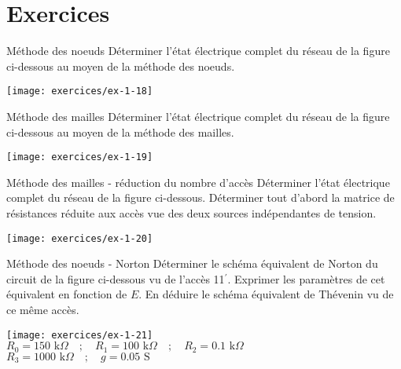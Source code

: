 
\section{Exercices}
\begin{exercise}{Méthode des noeuds}\label{ex:mg-1}
Déterminer l'état électrique complet du réseau de la  figure ci-dessous au
moyen de la méthode des noeuds.
\begin{center}
	\texttt{[image: exercices/ex-1-18]}
\end{center}
\end{exercise}

\begin{exercise}{Méthode des mailles}\label{ex:mg-2}
Déterminer l'état électrique complet du réseau de la  figure ci-dessous au
moyen de la méthode des mailles.
\begin{center}
	\texttt{[image: exercices/ex-1-19]}
\end{center}

\end{exercise}

\begin{exercise}{Méthode des mailles - réduction du nombre d'accès}\label{ex:mg-3}
Déterminer l'état électrique complet du réseau de la  figure ci-dessous.
Déterminer tout d'abord la matrice de résistances réduite
aux accès vue des deux sources indépendantes de tension.
\begin{center}
	\texttt{[image: exercices/ex-1-20]}
\end{center}

\end{exercise}

\begin{exercise}{Méthode des noeuds - Norton}\label{ex:mg-4}
Déterminer le schéma équivalent de Norton du circuit de la
 figure ci-dessous vu de l'accès 11$^{'}$. Exprimer les paramètres de
cet équivalent en fonction de $E$. En déduire le schéma équivalent de
Thévenin vu de ce même accès.

\begin{center}
\texttt{[image: exercices/ex-1-21]}\\
$R_0=150\mbox{~k}\Omega \quad ; \quad R_1=100  \mbox{~k}\Omega  \quad
; \quad R_2=0.1\mbox{~k}\Omega $\\
$R_3=1000 \mbox{~k}\Omega \quad ; \quad g=0.05 \mbox{~S}$
\end{center}

\end{exercise}


